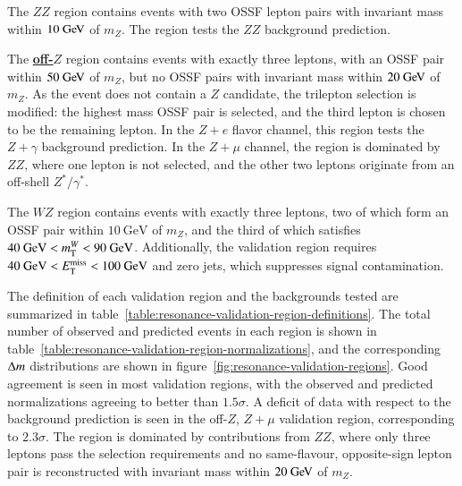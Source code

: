 The \underline{\textbf{$ZZ$}} region contains events with two OSSF lepton pairs with invariant mass within $10 \GeV$ of $m_Z$. The region tests the $ZZ$ background prediction.

The \underline{\textbf{off-$Z$}} region contains events with exactly three leptons, with an OSSF pair within $50 \GeV$ of $m_Z$, but no OSSF pairs with invariant mass within $20 \GeV$ of $m_Z$. As the event does not contain a $Z$ candidate, the trilepton selection is modified: the highest mass OSSF pair is selected, and the third lepton is chosen to be the remaining lepton. In the $Z+e$ flavor channel, this region tests the $Z+\gamma$ background prediction. In the $Z+\mu$ channel, the region is dominated by $ZZ$, where one lepton is not selected, and the other two leptons originate from an off-shell $Z^{*}/\gamma^{*}$. 

The \underline{\textbf{$WZ$}} region contains events with exactly three leptons, two of which form an OSSF pair within $10~\mbox{GeV}$ of $m_Z$, and the third of which satisfies $40~\mbox{GeV}<m_{\mathrm{T}}^W<90~\mbox{GeV}$. Additionally, the validation region requires $40~\mbox{GeV}<E_{\text{T}}^{\text{miss}}<100~\mbox{GeV}$ and zero jets, which suppresses signal contamination.

The definition of each validation region and the backgrounds tested are summarized in table~\ref{table:resonance-validation-region-definitions}. The total number of observed and predicted events in each region is shown in table~\ref{table:resonance-validation-region-normalizations}, and the corresponding $\Delta m$ distributions are shown in figure~\ref{fig:resonance-validation-regions}. Good agreement is seen in most validation regions, with the observed and predicted normalizations agreeing to better than $1.5\sigma$. A deficit of data with respect to the background prediction is seen in the off-$Z$, $Z+\mu$ validation region, corresponding to $2.3\sigma$. The region is dominated by contributions from $ZZ$, where only three leptons pass the selection requirements and no same-flavour, opposite-sign lepton pair is reconstructed with invariant mass within $20 \GeV$ of $m_Z$. 


